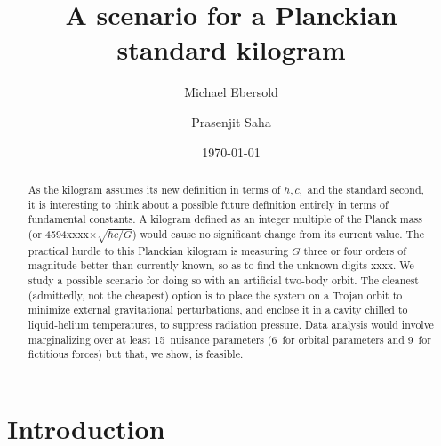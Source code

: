 \documentclass[prb,preprint]{revtex4-1}
\begin{document}

\title{A scenario for a Planckian standard kilogram}

\author{Michael Ebersold}
\author{Prasenjit Saha}


\date{\today}

\begin{abstract}
As the kilogram assumes its new definition in terms of $h,c,$ and the
standard second, it is interesting to think about a possible future
definition entirely in terms of fundamental constants.  A kilogram
defined as an integer multiple of the Planck mass (or
4594xxxx$\times\sqrt{\hbar c/G}$) would cause no significant change
from its current value.  The practical hurdle to this Planckian
kilogram is measuring $G$ three or four orders of magnitude better
than currently known, so as to find the unknown digits xxxx.  We study
a possible scenario for doing so with an artificial two-body orbit.
The cleanest (admittedly, not the cheapest) option is to place the
system on a Trojan orbit to minimize external gravitational
perturbations, and enclose it in a cavity chilled to liquid-helium
temperatures, to suppress radiation pressure.  Data analysis would
involve marginalizing over at least 15~nuisance parameters (6~for
orbital parameters and 9~for fictitious forces) but that, we show, is
feasible.
\end{abstract}

\maketitle

\section{Introduction}
\end{document}

